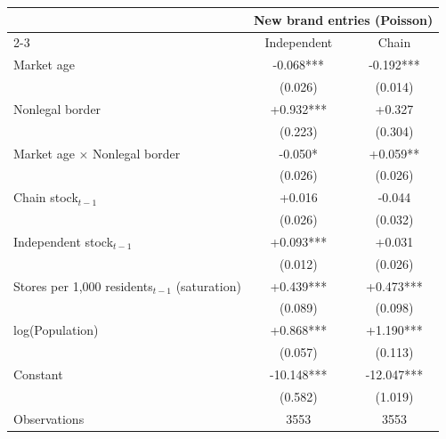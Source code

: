 \begin{tabular}{@{}lcc@{}}
\toprule
 & \multicolumn{2}{c}{New brand entries (Poisson)} \\
\cmidrule(lr){2-3}
 & Independent & Chain \\
\midrule
Market age & -0.068*** & -0.192*** \\
 & (0.026) & (0.014) \\
Nonlegal border & +0.932*** & +0.327 \\
 & (0.223) & (0.304) \\
Market age $\times$ Nonlegal border & -0.050* & +0.059** \\
 & (0.026) & (0.026) \\
Chain stock$_{t-1}$ & +0.016 & -0.044 \\
 & (0.026) & (0.032) \\
Independent stock$_{t-1}$ & +0.093*** & +0.031 \\
 & (0.012) & (0.026) \\
Stores per 1{,}000 residents$_{t-1}$ (saturation) & +0.439*** & +0.473*** \\
 & (0.089) & (0.098) \\
log(Population) & +0.868*** & +1.190*** \\
 & (0.057) & (0.113) \\
Constant & -10.148*** & -12.047*** \\
 & (0.582) & (1.019) \\
\midrule
Observations & 3553 & 3553 \\
\bottomrule
\end{tabular}
